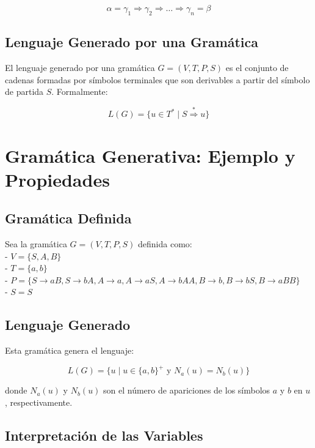 \documentclass[12pt]{book} %
\begin{document}
\[
\alpha = \gamma_1 \Rightarrow \gamma_2 \Rightarrow \ldots \Rightarrow \gamma_n = \beta
\]

\hypertarget{lenguaje-generado-por-una-gramuxe1tica}{%
\subsection{Lenguaje Generado por una
Gramática}\label{lenguaje-generado-por-una-gramuxe1tica}}

El lenguaje generado por una gramática \(G = (V, T, P, S)\) es el
conjunto de cadenas formadas por símbolos terminales que son derivables
a partir del símbolo de partida \(S\). Formalmente:

\[
L(G) = \{u \in T^* \mid S \overset{*}{\Rightarrow} u\}
\]

\hypertarget{gramuxe1tica-generativa-ejemplo-y-propiedades}{%
\section{Gramática Generativa: Ejemplo y
Propiedades}\label{gramuxe1tica-generativa-ejemplo-y-propiedades}}

\hypertarget{gramuxe1tica-definida}{%
\subsection{Gramática Definida}\label{gramuxe1tica-definida}}

Sea la gramática \(G = (V, T, P, S)\) definida como:\\
- \(V = \{S, A, B\}\)\\
- \(T = \{a, b\}\)\\
-
\(P = \{S \to aB, S \to bA, A \to a, A \to aS, A \to bAA, B \to b, B \to bS, B \to aBB\}\)\\
- \(S = S\)

\hypertarget{lenguaje-generado}{%
\subsection{Lenguaje Generado}\label{lenguaje-generado}}

Esta gramática genera el lenguaje:

\[
L(G) = \{u \mid u \in \{a, b\}^+ \text{ y } N_a(u) = N_b(u)\}
\]

donde \(N_a(u)\) y \(N_b(u)\) son el número de apariciones de los
símbolos \(a\) y \(b\) en \(u\), respectivamente.

\hypertarget{interpretaciuxf3n-de-las-variables}{%
\subsection{Interpretación de las
Variables}\label{interpretaciuxf3n-de-las-variables}}
\end{document}
